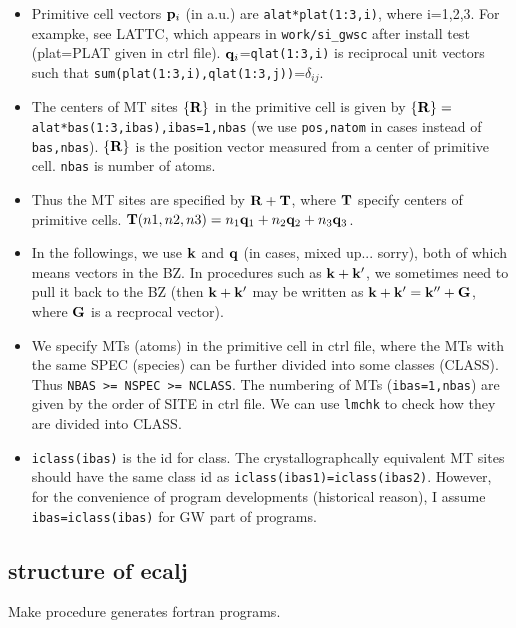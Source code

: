 \documentclass[a4paper,10pt,fleqn]{article}
\def\bfp{{\bf p}}
\newcommand{\bfq}{{\bf q}}
\newcommand{\bfk}{{\bf k}}
\newcommand{\bfT}{{\bf T}}
\newcommand{\bfG}{{\bf G}}
\newcommand{\bfR}{{\bf R}}
\newcommand{\io}[1]{{\sf  #1}}
\newcommand{\raw}[1]{{\tt #1}}
\begin{document}
\begin{itemize}
\item
Primitive cell vectors $\bfp_i$ (in a.u.) are
\raw{alat*plat(1:3,i)}, where i=1,2,3. For exampke, see \io{LATTC}, 
which appears in \verb#work/si_gwsc# after install test
(plat=PLAT given in ctrl file).
$\bfq_i$=\raw{qlat(1:3,i)} is reciprocal unit vectors such that
\raw{sum(plat(1:3,i),qlat(1:3,j))}=$\delta_{ij}$.

\item
The centers of MT sites $\{\bfR\}$ in the primitive cell
is given by $\{\bfR\}=$\raw{alat*bas(1:3,ibas),ibas=1,nbas} 
(we use \verb#pos,natom# in cases instead of \verb#bas,nbas#).
$\{\bfR\}$ is the position vector measured from 
a center of primitive cell.
\raw{nbas} is number of atoms.

\item
Thus the MT sites are specified by $\bfR+\bfT$, where $\bfT$ specify
centers of primitive 
cells. $\bfT(n1,n2,n3)=n_1 \bfq_1+n_2 \bfq_2 + n_3 \bfq_3$.

\item
In the followings, we use $\bfk$ and $\bfq$
(in cases, mixed up... sorry), both of
which means vectors in the BZ. In procedures such as $\bfk+\bfk'$, we
sometimes need to pull it back to the BZ (then $\bfk+\bfk'$ may be
written as $\bfk+\bfk'=\bfk''+\bfG$, where $\bfG$ is a
recprocal vector).

\item
  We specify MTs (atoms) in the primitive cell in ctrl file,
  where the MTs with the same SPEC (species) can be further 
  divided into some classes (CLASS). Thus \raw{NBAS >= NSPEC >= NCLASS}.
  The numbering of MTs (\verb#ibas=1,nbas#) are given 
  by the order of SITE in ctrl file.
  We can use \raw{lmchk} to check how they are divided into CLASS.

  
\item
\verb#iclass(ibas)# is the id for class. 
The crystallographcally equivalent MT sites should have the same class 
id as \verb#iclass(ibas1)=iclass(ibas2)#. 
However, for the convenience of program developments (historical reason), 
I assume {\tt ibas=iclass(ibas)} for GW part of programs.
  
\end{itemize}

\newpage
\subsection{structure of ecalj }
Make procedure generates fortran programs. 
\end{document}
